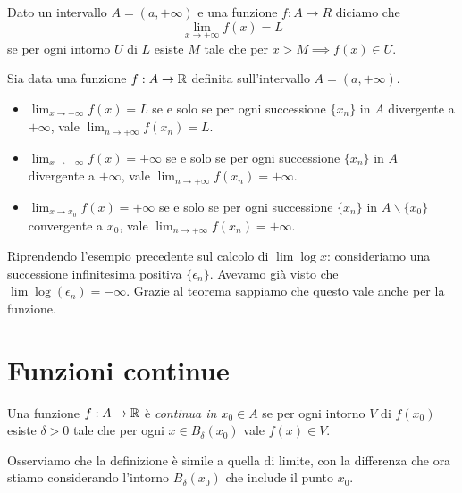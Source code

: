 \begin{definition}
Dato un intervallo $A = (a, +\infty)$ e una funzione $f: A \to R$ diciamo che
\begin{equation*}
\lim_{x \to +\infty} f(x) = L
\end{equation*}
se per ogni intorno $U$ di $L$ esiste $M$ tale che per $x > M \implies f(x) \in U$.
\end{definition}

\begin{theorem}
Sia data una funzione $f: A \to \mathbb R$ definita sull'intervallo $A = (a, +\infty)$. 

\begin{itemize}
\item $\lim_{x \to +\infty} f(x) = L$ se e solo se per ogni successione $\{x_n\}$ in $A$ divergente a $+\infty$, vale $\lim_{n \to +\infty} f(x_n) = L$.

\item $\lim_{x \to +\infty} f(x) = +\infty$ se e solo se per ogni successione $\{x_n\}$ in $A$ divergente a $+\infty$, vale $\lim_{n \to +\infty} f(x_n) = +\infty$.

\item $\lim_{x \to x_0} f(x) = +\infty$ se e solo se per ogni successione $\{x_n\}$ in $A \backslash\{x_0\}$ convergente a $x_0$, vale $\lim_{n \to +\infty} f(x_n) = +\infty$.

\end{itemize}
\end{theorem}

\begin{example}
Riprendendo l'esempio precedente sul calcolo di $\lim \log x$:  consideriamo una successione infinitesima positiva $\{\epsilon_n\}$. Avevamo già visto che $\lim \log (\epsilon_n) = -\infty$. Grazie al teorema sappiamo che questo vale anche per la funzione.
\end{example}

\section{Funzioni continue}
\begin{definition}
Una funzione $f: A \to \mathbb R$ è \emph{continua in $x_0 \in A$} se per ogni intorno $V$ di $f(x_0)$ esiste $\delta > 0$ tale che per ogni $x \in B_\delta (x_0)$ vale $f(x) \in V$.
\end{definition}

Osserviamo che la definizione è simile a quella di limite, con la differenza che ora stiamo considerando l'intorno $B_\delta (x_0)$ che include il punto $x_0$.


